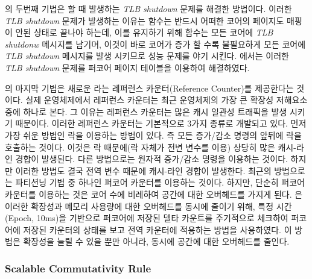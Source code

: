 의 두번째 기법은 할 때 발생하는 \textit{TLB shutdown} 문제를 해결한
방법이다.
이러한 \textit{TLB shutdown} 문제가 발생하는 이유는  함수는 반드시 어떠한 코어의 페이지도 매핑이 
안된 상태로 끝나야 하는데, 이를 유지하기 위해  함수는 모든 코어에 \textit{TLB shutdonw} 메시지를
남기며, 이것이 바로 코어가 증가 할 수록 불필요하게 모든 코어에 \textit{TLB shutdown} 메시지를 발생 시키므로 
성능 문제를 야기 시킨다.
에서는 이러한 \textit{TLB shutdown} 문제를 퍼코어 페이지 테이블을 이용하여 해결하였다. 

의 마지막 기법은 새로운 라는 레퍼런스 카운터(Reference Counter)를 제공한다는
것이다.
실제 운영체제에서 레퍼런스 카운터는 최근 운영체제의 가장 큰 확장성 저해요소 중에 하나로 본다.
그 이유는 레퍼런스 카운터는 많은 캐시 일관성 트래픽을 발생 시키기 때문이다.
이러한 레퍼런스 카운터는 기본적으로 3가지 종류로 개발되고 있다. 
먼저 가장 쉬운 방법인 락을 이용하는 방법이 있다. 
즉 모든 증가/감소 명령의 앞뒤에 락을 호출하는 것이다. 
이것은 락 때문에(락 자체가 전변 변수를 이용) 상당히 많은 캐시-라인 경합이 발생된다. 
다른 방법으로는 원자적 증가/감소 명령을 이용하는 것이다. 
하지만 이러한 방법도 결국 전역 변수 때문에 캐시-라인 경합이 발생한다. 
최근의 방법으로는 파티션닝 기법 중 하나인 퍼코어 카운터를 이용하는 것이다. 
하지만, 단순히 퍼코어 카운터를 이용하는 것은 코어 수에 비례하여 공간에 대한 오버헤드를 가지게 된다.
은 이러한 확장성과 메모리 사용량에 대한 오버헤드를 동시에 줄이기 위해, 
특정 시간(Epoch, 10ms)을 기반으로 퍼코어에 저장된 델타 카운트를 
주기적으로 체크하여 퍼코어에 저장된 카운터의 상태를 보고 전역 카운터에 적용하는 방법을 사용하였다.
이 방법은 확장성을 늘릴 수 있을 뿐만 아니라, 동시에 공간에 대한 오버헤드를 줄인다. 

\subsubsection{Scalable Commutativity Rule}

